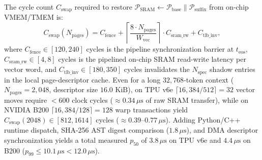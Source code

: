 \documentclass[10pt,conference]{IEEEtran}
\begin{document}
The cycle count $C_{\text{swap}}$ required to restore $\mathcal{P}_{\text{SRAM}} \leftarrow \mathcal{P}_{\text{base}} \parallel \mathcal{P}_{\text{suffix}}$ from on-chip VMEM/TMEM is:
\begin{equation}
C_{\text{swap}}(N_{\text{pages}}) = C_{\text{fence}} + \left\lceil \frac{8 \cdot N_{\text{pages}}}{W_{\text{vec}}} \right\rceil \cdot C_{\text{sram\_rw}} + C_{\text{tlb\_inv}},
\label{eq:sram_cycles}
\end{equation}
where $C_{\text{fence}} \in [120, 240]$ cycles is the pipeline synchronization barrier at $t_{\text{eos}}$, $C_{\text{sram\_rw}} \in [4, 8]$ cycles is the pipelined on-chip SRAM read-write latency per vector word, and $C_{\text{tlb\_inv}} \in [180, 350]$ cycles invalidates the $N_{\text{spec}}$ shadow entries in the local page-descriptor cache. Even for a long $32{,}768$-token context ($N_{\text{pages}} = 2{,}048$, descriptor size $16.0\text{ KiB}$), on TPU v6e $\lceil 16{,}384 / 512 \rceil = 32$ vector moves require $< 600$ clock cycles ($\approx 0.34\,\mu\text{s}$ of raw SRAM transfer), while on NVIDIA B200 $\lceil 16{,}384 / 128 \rceil = 128$ warp transactions yield $C_{\text{swap}}(2048) \in [812, 1614]$ cycles ($\approx 0.39$--$0.77\,\mu\text{s}$). Adding Python/C++ runtime dispatch, SHA-256 AST digest comparison ($1.8\,\mu\text{s}$), and DMA descriptor synchronization yields a total measured $p_{50}$ of $3.8\,\mu\text{s}$ on TPU v6e and $4.4\,\mu\text{s}$ on B200 ($p_{99} \le 10.1\,\mu\text{s} < 12.0\,\mu\text{s}$).
\end{document}
